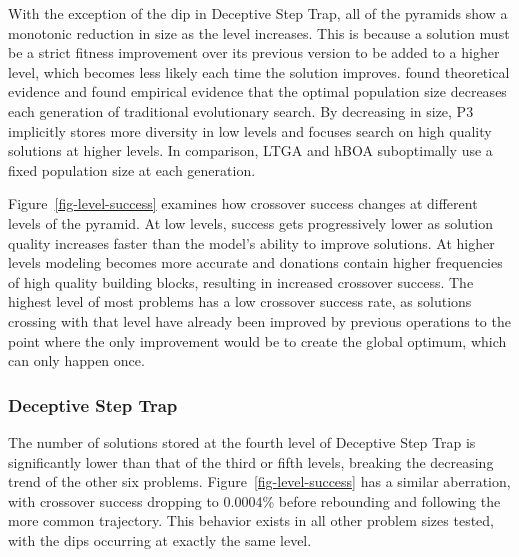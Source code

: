 \documentclass[twoside]{article}
\begin{document}
With the exception of the dip in Deceptive Step Trap, all of the pyramids show a monotonic reduction
in size as the level increases. This is because a solution must be a strict fitness improvement
over its previous version to be added to a higher level, which becomes less likely
each time the solution improves. \cite{lobo:2011:dynamicpop} found theoretical evidence
and \cite{goldman:2011:dynamic-parameters} found empirical evidence that the optimal
population size decreases each generation of traditional evolutionary search.
By decreasing in size, P3 implicitly stores more diversity in low levels and focuses
search on high quality solutions at higher levels. In comparison,
LTGA and hBOA suboptimally use a fixed population size at each generation.

Figure~\ref{fig-level-success} examines how crossover success changes at different
levels of the pyramid. At low levels, success gets progressively lower
as solution quality increases faster than the model's ability to improve solutions.
At higher levels modeling becomes more accurate and donations contain higher frequencies
of high quality building blocks, resulting in increased crossover success. The
highest level of most problems has a low crossover success rate, as solutions
crossing with that level have already been improved by previous operations to
the point where the only improvement would be to create the global optimum, which can
only happen once.

\subsubsection{Deceptive Step Trap}
The number of solutions stored at the fourth level of Deceptive Step Trap is
significantly lower than that of the third or fifth levels, breaking the decreasing
trend of the other six problems. Figure~\ref{fig-level-success} has a similar
aberration, with crossover success dropping to  0.0004\% before rebounding and
following the more common trajectory. This behavior exists in all other problem
sizes tested, with the dips occurring at exactly the same level.
\end{document}
